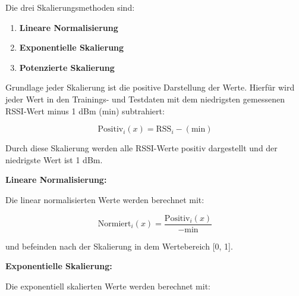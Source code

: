 Die drei Skalierungsmethoden sind:

\begin{enumerate}
    \item \textbf{Lineare Normalisierung}
    \item \textbf{Exponentielle Skalierung}
    \item \textbf{Potenzierte Skalierung}
\end{enumerate}




Grundlage jeder Skalierung ist die positive Darstellung der Werte. Hierfür wird jeder Wert in den Trainings- und Testdaten mit dem niedrigsten gemessenen RSSI-Wert minus 1 dBm (\(\text{min}\)) subtrahiert:

\begin{equation}
    \text{Positiv}_i(x) = \text{RSS}_i - (\text{min})
    \label{eq:positive_values_representation}
\end{equation}

Durch diese Skalierung werden alle RSSI-Werte positiv dargestellt und der niedrigste Wert ist 1 dBm.

\textbf{Lineare Normalisierung:}

Die linear normalisierten Werte werden berechnet mit:

\begin{equation}
    \text{Normiert}_i(x) = \frac{\text{Positiv}_i(x)}{-\text{min}}
    \label{eq:linear_normalized_values}
\end{equation}

und befeinden nach der Skalierung in dem Wertebereich [0, 1].

\textbf{Exponentielle Skalierung:}

Die exponentiell skalierten Werte werden berechnet mit:

